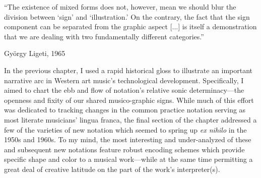 


\epigraph{\singlespacing ``The existence of mixed forms does not, however, mean we should blur the division between `sign' and `illustration.' On the contrary, the fact that the sign component can be separated from the graphic aspect [...] is itself a demonstration that we are dealing with two fundamentally different categories.''}{György Ligeti, 1965}




    In the previous chapter, I used a rapid historical gloss to illustrate an important narrative arc in Western art music's technological development. Specifically, I aimed to chart the ebb and flow of notation's relative sonic determinacy---the openness and fixity of our shared musico-graphic signs. While much of this effort was dedicated to tracking changes in the common practice notation serving as most literate musicians' lingua franca, the final section of the chapter addressed a few of the varieties of new notation which seemed to spring up \textit{ex nihilo} in the 1950s and 1960s. To my mind, the most interesting and under-analyzed of these and subsequent new notations feature robust encoding schemes which provide specific shape and color to a musical work---while at the same time permitting a great deal of creative latitude on the part of the work's interpreter(s).
    
